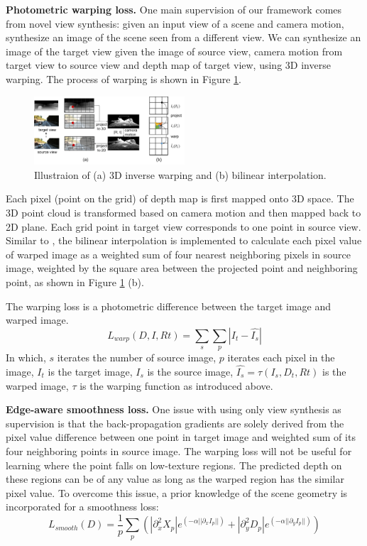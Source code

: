 \textbf{Photometric warping loss.} 
\label{chap:warping}
One main supervision of our framework comes from novel view synthesis: given an input view of a scene and camera motion, synthesize an image of the scene seen from a different view. We can synthesize an image of the target view given the image of source view, camera motion from target view to source view and depth map of target view, using 3D inverse warping. The process of warping is shown in Figure \ref{fig:3d_warping}.
\begin{figure}
\centering
\includegraphics[width=0.5\textwidth]{figures/3d_warping.pdf}
\caption{Illustraion of (a) 3D inverse warping and (b) bilinear interpolation.}
\label{fig:3d_warping}
\end{figure}
Each pixel (point on the grid) of depth map is first mapped onto 3D space. The 3D point cloud is transformed based on camera motion and then mapped back to 2D plane. Each grid point in target view corresponds to one point in source view. Similar to \cite{jaderberg2015spatial}, the bilinear interpolation is implemented to calculate each pixel value of warped image as a weighted sum of four nearest neighboring pixels in source image, weighted by the square area between the projected point and neighboring point, as shown in Figure \ref{fig:3d_warping} (b).

The warping loss is a photometric difference between the target image and warped image. $$L_{warp}(D, I, Rt) = \sum_s\sum_p|I_t - \hat{I_s}|$$
In which, $s$ iterates the number of source image, $p$ iterates each pixel in the image, $I_t$ is the target image, $I_s$ is the source image, $\hat{I_s} = \tau(I_s, D_t, Rt)$ is the warped image, $\tau$ is the warping function as introduced above.

\textbf{Edge-aware smoothness loss.} One issue with using only view synthesis as supervision is that the back-propagation gradients are solely derived from the pixel value difference between one point in target image and weighted sum of its four neighboring points in source image. The warping loss will not be useful for learning where the point falls on low-texture regions. The predicted depth on these regions can be of any value as long as the warped region has the similar pixel value.  To overcome this issue, a prior knowledge of the scene geometry is incorporated for a smoothness loss:
\small
$$L_{smooth}(D) = \frac{1}{p} \sum_{p}(|\partial^2_xX_p|e^{(-\alpha||\partial_xI_p||)} + |\partial^2_yD_p|e^{(-\alpha||\partial_yI_p||)})$$
\normalsize

